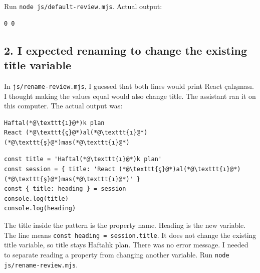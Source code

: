 \documentclass[
  10pt,
  a4paper,
]{article}
\begin{document}

Run \texttt{node js/\allowbreak{}default-review.\allowbreak{}mjs}.
Actual output:

\begin{minipage}{\linewidth}

\begin{lstlisting}
0 0
\end{lstlisting}

\end{minipage}\par

\subsection{2. I expected renaming to change the existing title
variable}\label{i-expected-renaming-to-change-the-existing-title-variable}

In \texttt{js/\allowbreak{}rename-review.\allowbreak{}mjs}, I guessed
that both lines would print React çalışması. I thought making the values
equal would also change title. The assistant ran it on this computer.
The actual output was:

\begin{minipage}{\linewidth}

\begin{lstlisting}
Haftal(*@\texttt{ı}@*)k plan
React (*@\texttt{ç}@*)al(*@\texttt{ı}@*)(*@\texttt{ş}@*)mas(*@\texttt{ı}@*)
\end{lstlisting}

\end{minipage}\par

\begin{minipage}{\linewidth}

\begin{lstlisting}
const title = 'Haftal(*@\texttt{ı}@*)k plan'
const session = { title: 'React (*@\texttt{ç}@*)al(*@\texttt{ı}@*)(*@\texttt{ş}@*)mas(*@\texttt{ı}@*)' }
const { title: heading } = session
console.log(title)
console.log(heading)
\end{lstlisting}

\end{minipage}\par

The title inside the pattern is the property name. Heading is the new
variable. The line means
\texttt{const heading = session.\allowbreak{}title}. It does not change
the existing title variable, so title stays Haftalık plan. There was no
error message. I needed to separate reading a property from changing
another variable. Run
\texttt{node js/\allowbreak{}rename-review.\allowbreak{}mjs}.
\end{document}
